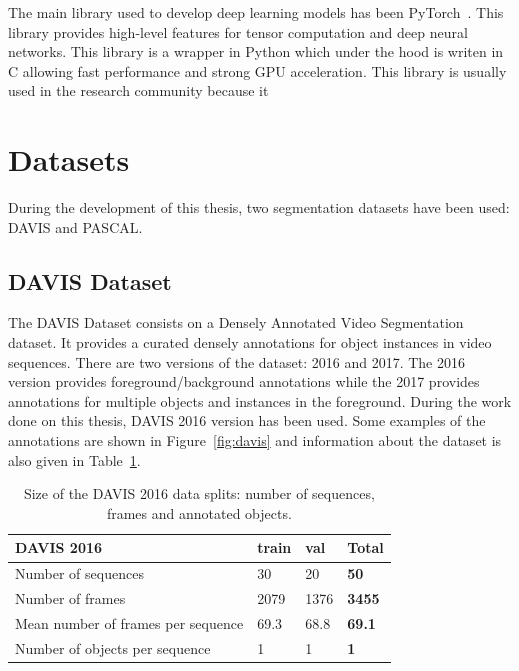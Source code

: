 The main library used to develop deep learning models has been PyTorch~\cite{paszke2017automatic}. This library provides high-level features for tensor computation and deep neural networks.
This library is a wrapper in Python which under the hood is writen in C allowing fast performance and strong GPU acceleration.
This library is usually used in the research community because it

\section{Datasets}

During the development of this thesis, two segmentation datasets have been used: DAVIS and PASCAL.


\subsection{DAVIS Dataset}

The DAVIS Dataset \cite{Perazzi2016} consists on a Densely Annotated Video Segmentation dataset.
It provides a curated densely annotations for object instances in video sequences.
There are two versions of the dataset: 2016 and 2017. The 2016 version provides foreground/background annotations while the 2017 provides annotations for multiple objects and instances in the foreground.
During the work done on this thesis, DAVIS 2016 version has been used.
Some examples of the annotations are shown in Figure~\ref{fig:davis} and information about the dataset is also given in Table~\ref{table:davis}.

\begin{table}[h]
\centering
\begin{tabular}{l|lll}
DAVIS 2016                         & train & val  & \textbf{Total} \\
\hline
Number of sequences                & 30    & 20   & \textbf{50}    \\
Number of frames                   & 2079  & 1376 & \textbf{3455}  \\
Mean number of frames per sequence & 69.3  & 68.8 & \textbf{69.1}  \\
Number of objects per sequence     & 1     & 1    & \textbf{1}     \\
\end{tabular}
\caption{Size of the DAVIS 2016 data splits: number of sequences, frames and annotated objects.}
\label{table:davis}
\end{table}

